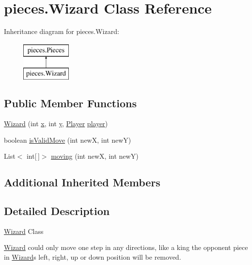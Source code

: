 \hypertarget{classpieces_1_1_wizard}{}\section{pieces.\+Wizard Class Reference}
\label{classpieces_1_1_wizard}
Inheritance diagram for pieces.\+Wizard\+:\begin{figure}[H]
\begin{center}
\leavevmode
\includegraphics[height=2.000000cm]{classpieces_1_1_wizard}
\end{center}
\end{figure}
\subsection*{Public Member Functions}
\begin{DoxyCompactItemize}
\item 
\mbox{\hyperlink{classpieces_1_1_wizard_a33267d1b4e462ecc51b2a77d454ea98e}{Wizard}} (int \mbox{\hyperlink{classpieces_1_1_pieces_ac5178f9b8a6b0c4235851475081249f3}{x}}, int \mbox{\hyperlink{classpieces_1_1_pieces_a66d911734967a8ced1b9792fe900fadb}{y}}, \mbox{\hyperlink{classgame_1_1_player}{Player}} \mbox{\hyperlink{classpieces_1_1_pieces_a49f35044dd36e5c4b04261a8ea54ad0c}{player}})
\item 
boolean \mbox{\hyperlink{classpieces_1_1_wizard_ac8894909924ae970cb63b68d131bf2da}{is\+Valid\+Move}} (int newX, int newY)
\item 
List$<$ int\mbox{[}$\,$\mbox{]}$>$ \mbox{\hyperlink{classpieces_1_1_wizard_a477ebc0284c9c2a16513a7a7c9dc224e}{moving}} (int newX, int newY)
\end{DoxyCompactItemize}
\subsection*{Additional Inherited Members}


\subsection{Detailed Description}
\mbox{\hyperlink{classpieces_1_1_wizard}{Wizard}} Class 

\mbox{\hyperlink{classpieces_1_1_wizard}{Wizard}} could only move one step in any directions, like a king the opponent piece in \mbox{\hyperlink{classpieces_1_1_wizard}{Wizard}}\textquotesingle{}s left, right, up or down position will be removed. 

